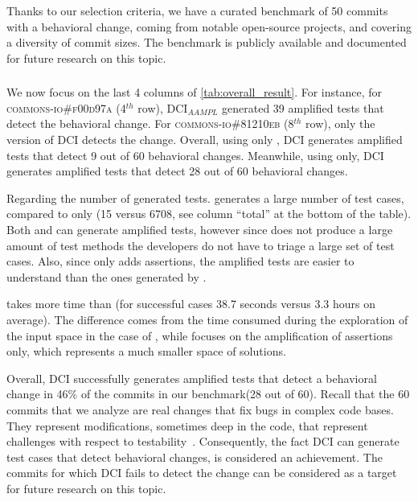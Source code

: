 Thanks to our selection criteria, we have a curated benchmark of 50 commits with a behavioral change, coming from notable open-source projects, and covering a diversity of commit sizes. The benchmark is publicly available and documented for future research on this topic.

\subsubsection{\rqdetection}
\label{subsubsec:answerq2}

We now focus on the last 4 columns of \autoref{tab:overall_result}.
For instance, for \textsc{commons-io\#f00d97a} (4$^{th}$ row), DCI$_{AAMPL}$ generated 39 amplified tests that detect the behavioral change. 
For \textsc{commons-io\#81210eb} (8$^{th}$ row), only the \sbampl version of DCI detects the change.
%
Overall, using only \aampl, DCI generates amplified tests that detect 9 out of 60 behavioral changes.
Meanwhile, using \sbampl only, DCI generates amplified tests that detect 28 out of 60 behavioral changes.

Regarding the number of generated tests.
\DCII generates a large number of test cases, compared to \DCIA only (15 versus 6708, see column ``total'' at the bottom of the table). 
Both \DCIA and \DCIA can generate amplified tests, however since \DCIA does not produce a large amount of test methods the developers do not have to triage a large set of test cases. 
Also, since \DCIA only adds assertions, the amplified tests are easier to understand than the ones generated by \DCII.

\DCII takes more time than \DCIA (for successful cases 38.7 seconds versus 3.3 hours on average).
The difference comes from the time consumed during the exploration of the input space in the case of \DCII, while \DCIA focuses on the amplification of assertions only, which represents a much smaller space of solutions. 

Overall, DCI successfully generates amplified tests that detect a behavioral change in 46\% of the commits in our benchmark(28 out of 60).
Recall that the 60 commits that we analyze are real changes that fix bugs in complex code bases.
They represent modifications, sometimes deep in the code, that represent challenges with respect to testability~\cite{voas1995software}.
Consequently, the fact DCI can generate test cases that detect behavioral changes, is considered an achievement.
The commits for which DCI fails to detect the change can be considered as a target for future research on this topic.

